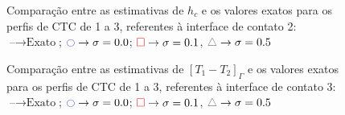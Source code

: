 %
\begin{figure}[h!b]
	\caption{Comparação entre as estimativas de $h_c$ e os valores exatos para os perfis de CTC de 1 a 3, referentes à interface de contato 2: $\text{--} \rightarrow \text{Exato}$; $\textcolor{blue}{\ocircle} \rightarrow \sigma = 0.0$; $\textcolor{red}{\square} \rightarrow \sigma = 0.1$, $\textcolor{gray}{\triangle} \rightarrow \sigma = 0.5$}
\end{figure}
%
%
\begin{figure}[h!b]
	\caption{Comparação entre as estimativas de $[T_1 - T_2]_\Gamma$ e os valores exatos para os perfis de CTC de 1 a 3, referentes à interface de contato 3: $\text{--} \rightarrow \text{Exato}$; $\textcolor{blue}{\ocircle} \rightarrow \sigma = 0.0$; $\textcolor{red}{\square} \rightarrow \sigma = 0.1$, $\textcolor{gray}{\triangle} \rightarrow \sigma = 0.5$}
\end{figure}
%
